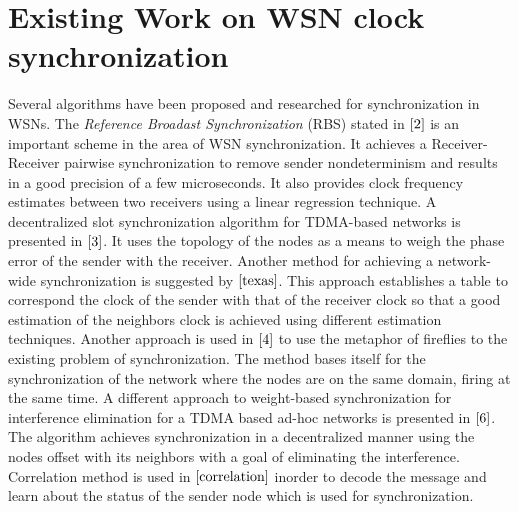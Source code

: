 \documentclass[a4paper,10pt]{report}
\begin{document}
\section{\textbf{Existing Work on WSN clock synchronization}}
Several algorithms have been proposed and researched for synchronization in WSNs. The \textit{Reference Broadast Synchronization} (RBS) stated in $\cite{2}$ is an important scheme in the area of WSN synchronization. It achieves a Receiver-Receiver pairwise synchronization to remove sender nondeterminism and results in a good precision of a few microseconds. It also provides clock frequency estimates between two receivers using a linear regression technique. A decentralized slot synchronization algorithm for TDMA-based networks is presented in $\cite{3}$. It uses the topology of the nodes as a means to weigh the phase error of the sender with the receiver. \newline 
Another method for achieving a network-wide synchronization is suggested by $\cite{texas}$. This approach establishes a table to
correspond the clock of the sender with that of the receiver clock so that a good estimation of the neighbors clock is achieved using different estimation techniques. Another approach is used in $\cite{4}$ to use the metaphor of fireflies to the existing problem of synchronization. The method bases itself for the synchronization of the network where the nodes are on the same domain, firing at the same time. A different approach to weight-based synchronization for interference elimination for a TDMA based ad-hoc networks is presented in  $\cite{6}$. The algorithm achieves synchronization in a decentralized manner using the nodes offset with its neighbors with a goal of eliminating the interference. Correlation method is used in $\cite{correlation}$ inorder to decode the message and learn about the status of the sender node which is used for synchronization.
\end{document}
